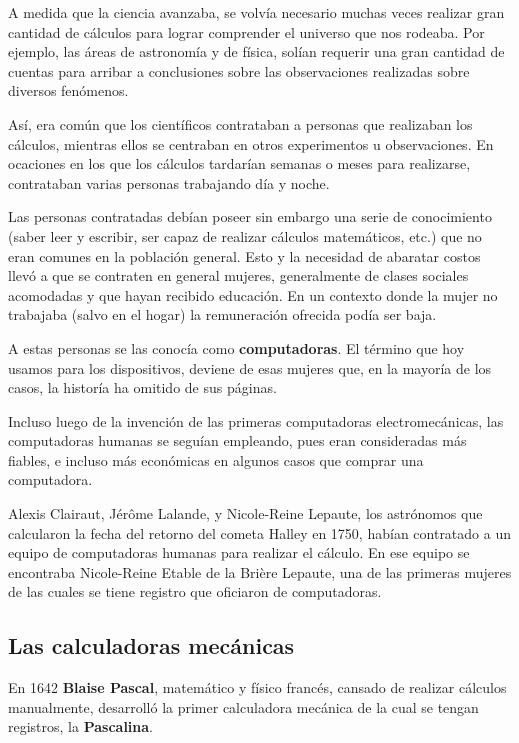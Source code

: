 A medida que la ciencia avanzaba, se volvía necesario muchas veces realizar
gran cantidad de cálculos para lograr comprender el universo que nos rodeaba.
Por ejemplo, las áreas de astronomía y de física, solían requerir una gran cantidad
de cuentas para arribar a conclusiones sobre las observaciones realizadas sobre
diversos fenómenos.

Así, era común que los científicos contrataban a personas que realizaban
los cálculos, mientras ellos se centraban en otros experimentos u observaciones.
En ocaciones en los que los cálculos tardarían semanas o meses para realizarse,
contrataban varias personas trabajando día y noche.

Las personas contratadas debían poseer sin embargo una serie de conocimiento
(saber leer y escribir, ser capaz de realizar cálculos matemáticos, etc.) que no
eran comunes en la población general. Esto y la necesidad de abaratar costos
llevó a que se contraten en general mujeres, generalmente de clases sociales
acomodadas y que hayan recibido educación. En un contexto donde la mujer no
trabajaba (salvo en el hogar) la remuneración ofrecida podía ser baja.\cite[p23]{evans_2018}

A estas personas se las conocía como \textbf{computadoras}. El término
que hoy usamos para los dispositivos, deviene de esas mujeres que, en la
mayoría de los casos, la historía ha omitido de sus páginas.

Incluso luego de la invención de las primeras computadoras electromecánicas, las
computadoras humanas se seguían empleando, pues eran consideradas más fiables, e
incluso más económicas en algunos casos que comprar una computadora.

\begin{knowwhat}
    Alexis Clairaut, Jérôme Lalande, y Nicole-Reine Lepaute, los astrónomos
    que calcularon la fecha del retorno del cometa Halley en 1750, habían contratado
    a un equipo de computadoras humanas para realizar el cálculo. En ese equipo se
    encontraba Nicole-Reine Etable de la Brière Lepaute, una de las primeras mujeres
    de las cuales se tiene registro que oficiaron de computadoras.
\end{knowwhat}

\subsection{Las calculadoras mecánicas}

En 1642 \textbf{Blaise Pascal}, matemático y físico francés, cansado de
realizar cálculos manualmente, desarrolló la primer calculadora mecánica de la
cual se tengan registros, la \textbf{Pascalina}.

